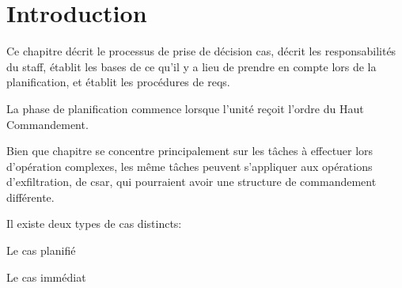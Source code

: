 

\section{Introduction}

Ce chapitre décrit le processus de prise de décision \gls{cas}, décrit les responsabilités du staff, établit les bases de ce qu'il y a lieu de prendre en compte lors de la planification, et établit les procédures de \glspl{req}.

La phase de planification commence lorsque l'unité reçoit l'ordre du Haut Commandement.

Bien que chapitre se concentre principalement sur les tâches à effectuer lors d'opération complexes, les même tâches peuvent s'appliquer aux opérations d'exfiltration, de \gls{csar}, qui pourraient avoir une structure de commandement différente.


\begin{e1}
	\item Il existe deux types de \gls{cas} distincts:
	\begin{e2}
		\item Le \gls{cas} planifié
		\item Le \gls{cas} immédiat
	\end{e2}
\end{e1}